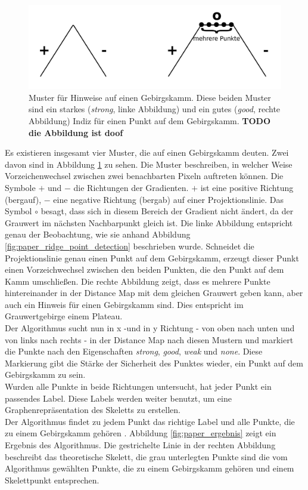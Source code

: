 \begin{figure}
\centering
\includegraphics[width=0.8\linewidth]{./fig/muster_strong_good.pdf}
\caption{Muster für Hinweise auf einen Gebirgskamm. Diese beiden Muster sind ein starkes (\emph{strong}, linke Abbildung) und ein gutes (\emph{good}, rechte Abbildung) Indiz für einen Punkt auf dem Gebirgskamm. \textbf{TODO die Abbildung ist doof}}
\label{fig:muster_strong_good}
\end{figure}
Es existieren insgesamt vier Muster, die auf einen Gebirgskamm deuten. Zwei davon sind in Abbildung \ref{fig:muster_strong_good}
zu sehen. Die Muster beschreiben, in welcher Weise Vorzeichenwechsel zwischen zwei benachbarten Pixeln auftreten können. Die Symbole $+$ und $-$ die Richtungen der Gradienten. $+$ ist eine positive Richtung (bergauf), $-$ eine negative Richtung (bergab) auf einer Projektionslinie. Das Symbol $\circ$ besagt, dass sich in diesem Bereich der Gradient nicht ändert, da der Grauwert im nächsten Nachbarpunkt gleich ist. Die linke Abbildung entspricht genau der Beobachtung, wie sie anhand Abbildung
\ref{fig:paper_ridge_point_detection} beschrieben wurde. Schneidet die Projektionslinie genau einen Punkt auf dem Gebirgskamm,
erzeugt dieser Punkt einen Vorzeichwechsel zwischen den beiden Punkten, die den Punkt auf dem Kamm umschließen. Die rechte
Abbildung zeigt, dass es mehrere Punkte hintereinander in der Distance Map mit dem gleichen Grauwert geben kann, aber auch ein
Hinweis für einen Gebirgskamm sind. Dies entspricht im Grauwertgebirge einem Plateau.\\
Der Algorithmus sucht nun in x -und in y Richtung - von oben nach unten und von links nach rechts - in der Distance Map nach diesen Mustern und markiert die Punkte nach den Eigenschaften \emph{strong}, \emph{good}, \emph{weak} und \emph{none}. 
Diese Markierung gibt die Stärke der Sicherheit des Punktes wieder, ein Punkt auf dem Gebirgskamm zu sein. \\
Wurden alle Punkte in beide Richtungen untersucht, hat jeder Punkt ein passendes Label. Diese Labels werden weiter benutzt, um eine Graphenrepräsentation des Skeletts zu erstellen.\\
Der Algorithmus findet zu jedem Punkt das richtige Label und alle Punkte, die zu einem Gebirgskamm gehören \cite{extracting_skeletons_distancemaps}. Abbildung \ref{fig:paper_ergebnis} zeigt ein Ergebnis des Algorithmus. Die gestrichelte Linie in der rechten Abbildung beschreibt das theoretische Skelett, die grau unterlegten Punkte sind die vom Algorithmus gewählten Punkte, die zu einem Gebirgskamm gehören und einem Skelettpunkt entsprechen.
